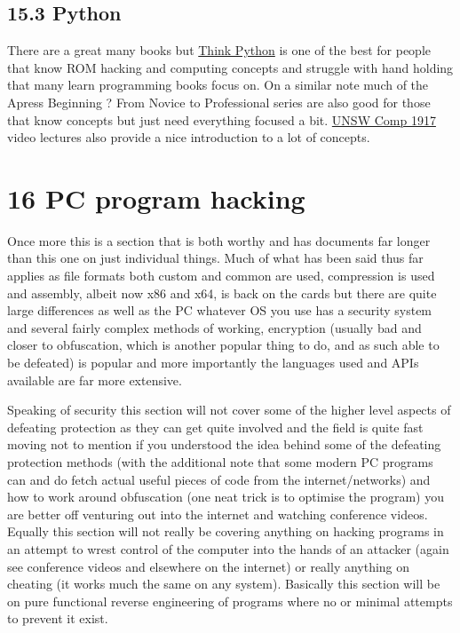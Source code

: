 \documentclass[
]{book}
\begin{document}
\hypertarget{python}{%
\section{15.3 Python}\label{python}}

There are a great many books but \href{http://greenteapress.com/thinkpython/thinkpython.html}{Think Python} is one of the best for people that know ROM hacking and computing concepts and struggle with hand holding that many learn programming books focus on. On a similar note much of the Apress Beginning ? From Novice to Professional series are also good for those that know concepts but just need everything focused a bit. \href{http://www.youtube.com/watch?v=hE7l6Adoiiw\&feature=BFa\&list=PL6B940F08B9773B9F}{UNSW Comp 1917} video lectures also provide a nice introduction to a lot of concepts.

\hypertarget{pc-program-hacking}{%
\chapter{16 PC program hacking}\label{pc-program-hacking}}

Once more this is a section that is both worthy and has documents far longer than this one on just individual things. Much of what has been said thus far applies as file formats both custom and common are used, compression is used and assembly, albeit now x86 and x64, is back on the cards but there are quite large differences as well as the PC whatever OS you use has a security system and several fairly complex methods of working, encryption (usually bad and closer to obfuscation, which is another popular thing to do, and as such able to be defeated) is popular and more importantly the languages used and APIs available are far more extensive.

Speaking of security this section will not cover some of the higher level aspects of defeating protection as they can get quite involved and the field is quite fast moving not to mention if you understood the idea behind some of the defeating protection methods (with the additional note that some modern PC programs can and do fetch actual useful pieces of code from the internet/networks) and how to work around obfuscation (one neat trick is to optimise the program) you are better off venturing out into the internet and watching conference videos. Equally this section will not really be covering anything on hacking programs in an attempt to wrest control of the computer into the hands of an attacker (again see conference videos and elsewhere on the internet) or really anything on cheating (it works much the same on any system). Basically this section will be on pure functional reverse engineering of programs where no or minimal attempts to prevent it exist.
\end{document}
